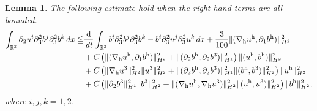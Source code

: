 \documentclass[10pt,a4paper]{amsart}
\newtheorem{lem}{Lemma}
\newcommand{\R}{\mathbb{R}}
\newcommand{\dt}{\,{\rm d}t}
\newcommand{\dx}{\,{\rm d}x}
\newcommand{\h}{\mathrm{h}}
\newcommand{\nablah}{\nabla_{\mathrm{h}}}
\begin{document}
\begin{lem}\label{wild}
	The following estimate hold when the right-hand terms are all bounded.
	\begin{align}\label{Esti.wild}
		\int_{\R^3}\partial_2u^i\partial_3^2b^j\partial_3^2b^k\dx\leqq&\frac{\mathrm{d}}{\dt}\int_{\R^3} b^i\partial_3^2b^j\partial_3^2b^k-b^i\partial_3^2u^j\partial_3^2u^k\dx+\frac{3}{100}\|(\nablah u^\h,\partial_1b^\h)\|_{H^2}^2\nonumber\\
		&+C\left(\|(\nablah u^\h,\partial_1b^\h)\|_{H^2}^2+\|(\partial_2b^\h,\partial_2b^3)\|_{H^1}^2\right)\|(u^\h,b^\h)\|_{H^2}^2\nonumber\\
		&+C\left(\|\nablah u^3\|_{H^2}^2\|u^3\|_{H^2}^2+ \|(\partial_2b^\h,\partial_2b^3)\|_{H^1}^2\|(b^\h,b^3)\|_{H^2}^2\right)\|u^\h\|_{H^2}^2\nonumber\\	&+C\left(\|\partial_2b^3\|_{H^1}^2\|b^3\|_{H^2}^2+\|(\nablah u^\h,\nablah u^3)\|_{H^2}^2\|(u^\h,u^3)\|_{H^2}^2\right)\|b^\h\|_{H^2}^2,
	\end{align}
	where $i,j,k=1,2$.
\end{lem}
\end{document}
